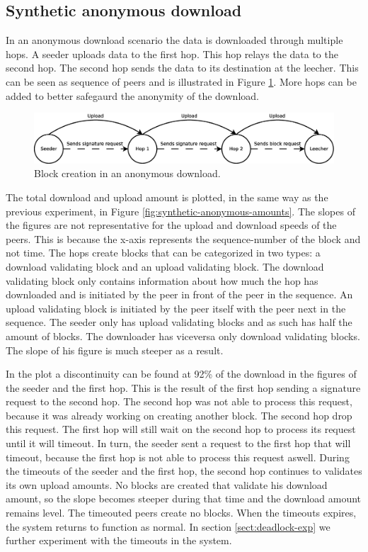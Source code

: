 \subsection{Synthetic anonymous download}
In an anonymous download scenario the data is downloaded through multiple hops.
A seeder uploads data to the first hop.
This hop relays the data to the second hop.
The second hop sends the data to its destination at the leecher.
This can be seen as sequence of peers and is illustrated in Figure \ref{fig:seeder-hops-leecher}.
More hops can be added to better safegaurd the anonymity of the download.

\begin{figure}
	\centerline{\includegraphics[scale=0.3]{experimentation/anonymous/seeder-hops-leecher.eps}}
	\caption{Block creation in an anonymous download.}
	\label{fig:seeder-hops-leecher}
\end{figure}

The total download and upload amount is plotted, in the same way as the previous experiment,
in Figure \ref{fig:synthetic-anonymous-amounts}.
The slopes of the figures are not representative for the upload and download speeds of the peers.
This is because the x-axis represents the sequence-number of the block and not time.
The hops create blocks that can be categorized in two types:
a download validating block and an upload validating block.
The download validating block only contains information about how much the hop has downloaded
and is initiated by the peer in front of the peer in the sequence.
An upload validating block is initiated by the peer itself with the peer next in the sequence.
The seeder only has upload validating blocks and as such has half the amount of blocks.
The downloader has viceversa only download validating blocks.
The slope of his figure is much steeper as a result.

In the plot a discontinuity can be found at 92\% of the download in the figures of the seeder and the first hop.
This is the result of the first hop sending a signature request to the second hop.
The second hop was not able to process this request,
because it was already working on creating another block.
The second hop drop this request.
The first hop will still wait on the second hop to process its request until it will timeout.
In turn, the seeder sent a request to the first hop that will timeout,
because the first hop is not able to process this request aswell.
During the timeouts of the seeder and the first hop,
the second hop continues to validates its own upload amounts.
No blocks are created that validate his download amount,
so the slope becomes steeper during that time and the download amount remains level.
The timeouted peers create no blocks.
When the timeouts expires, the system returns to function as normal.
In section \ref{sect:deadlock-exp} we further experiment with the timeouts in the system.

